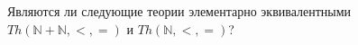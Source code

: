 Являются ли следующие теории элементарно эквивалентными $Th(\mathbb{N} + \mathbb{N}, <, =)$ и $Th(\mathbb{N}, <, =)$?
